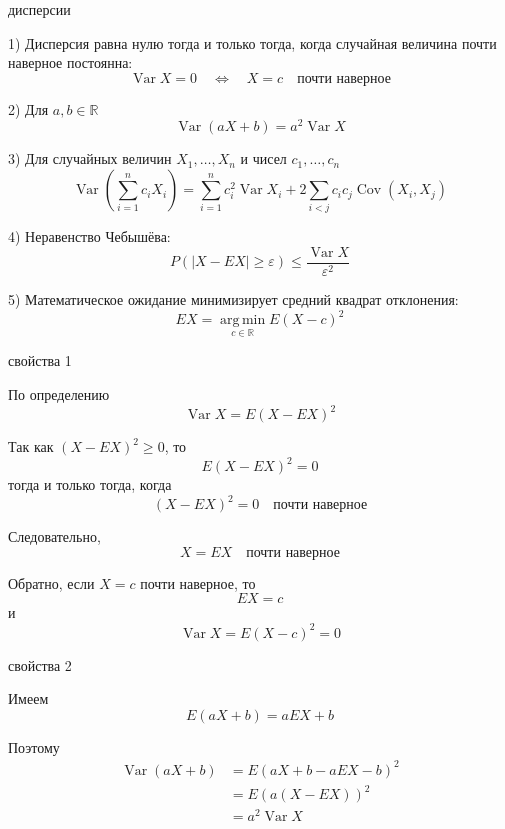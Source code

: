 \documentclass[12pt,a4paper]{article}
\begin{document}
\begin{props}{дисперсии}

1) Дисперсия равна нулю тогда и только тогда, когда случайная величина почти наверное постоянна:
\[
\operatorname{Var}X=0
\quad\Longleftrightarrow\quad
X=c\quad\text{почти наверное}
\]

\medskip

2) Для $a,b\in\mathbb{R}$
\[
\operatorname{Var}(aX+b)
=
a^2\operatorname{Var}X
\]

\medskip

3) Для случайных величин $X_1,\ldots,X_n$ и чисел $c_1,\ldots,c_n$
\[
\operatorname{Var}\left(\sum_{i=1}^n c_iX_i\right)
=
\sum_{i=1}^n c_i^2\operatorname{Var}X_i
+
2\sum_{i<j}c_ic_j\operatorname{Cov}(X_i,X_j)
\]

\medskip

4) Неравенство Чебышёва:
\[
P\left(|X-EX|\geq\varepsilon\right)
\leq
\frac{\operatorname{Var}X}{\varepsilon^2}
\]

\medskip

5) Математическое ожидание минимизирует средний квадрат отклонения:
\[
EX
=
\operatorname*{arg\,min}_{c\in\mathbb{R}}
E(X-c)^2
\]

\end{props}

\begin{proofbox}{свойства 1}

По определению
\[
\operatorname{Var}X
=
E(X-EX)^2
\]

Так как $(X-EX)^2\geq0$, то
\[
E(X-EX)^2=0
\]
тогда и только тогда, когда
\[
(X-EX)^2=0
\quad\text{почти наверное}
\]

Следовательно,
\[
X=EX
\quad\text{почти наверное}
\]

Обратно, если $X=c$ почти наверное, то
\[
EX=c
\]
и
\[
\operatorname{Var}X
=
E(X-c)^2
=
0
\]

\end{proofbox}

\begin{proofbox}{свойства 2}

Имеем
\[
E(aX+b)=aEX+b
\]

Поэтому
\[
\begin{aligned}
\operatorname{Var}(aX+b)
&=
E\left(aX+b-aEX-b\right)^2\\
&=
E\left(a(X-EX)\right)^2\\
&=
a^2\operatorname{Var}X
\end{aligned}
\]

\end{proofbox}
\end{document}
